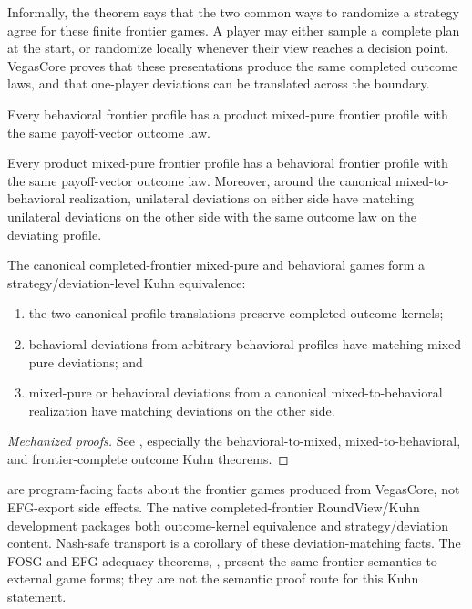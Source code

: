 Informally, the theorem says that the two common ways to randomize a
strategy agree for these finite frontier games.  A player may either
sample a complete plan at the start, or randomize locally whenever their
view reaches a decision point.  VegasCore proves that these
presentations produce the same completed outcome laws, and that
one-player deviations can be translated across the boundary.

\begin{theorem}
\label{thm:kuhn-beh-to-mixed}
Every behavioral frontier profile has a product mixed-pure frontier
profile with the same payoff-vector outcome law.
\end{theorem}

\begin{theorem}
\label{thm:kuhn-mixed-to-beh}
Every product mixed-pure frontier profile has a behavioral frontier
profile with the same payoff-vector outcome law.  Moreover, around the
canonical mixed-to-behavioral realization, unilateral deviations on
either side have matching unilateral deviations on the other side with
the same outcome law on the deviating profile.
\end{theorem}

\begin{theorem}
\label{thm:kuhn-strategic-equivalence}
The canonical completed-frontier mixed-pure and behavioral games form a
strategy/deviation-level Kuhn equivalence:
\begin{enumerate}[leftmargin=1.6em,itemsep=1pt,topsep=2pt]
\item the two canonical profile translations preserve completed outcome
  kernels;
\item behavioral deviations from arbitrary behavioral profiles have matching
  mixed-pure deviations; and
\item mixed-pure or behavioral deviations from a canonical
  mixed-to-behavioral realization have matching deviations on the other side.
\end{enumerate}
\end{theorem}

\begin{proof}[Mechanized proofs]
See , especially the behavioral-to-mixed,
mixed-to-behavioral, and frontier-complete outcome Kuhn theorems.
\end{proof}

are program-facing facts about the frontier games produced from
VegasCore, not EFG-export side effects.
The native completed-frontier RoundView/Kuhn development packages both
outcome-kernel equivalence and strategy/deviation content.  Nash-safe
transport is a corollary of these deviation-matching facts.  The FOSG
and EFG adequacy theorems, , present the same
frontier semantics to external game forms; they are not the semantic
proof route for this Kuhn statement.


